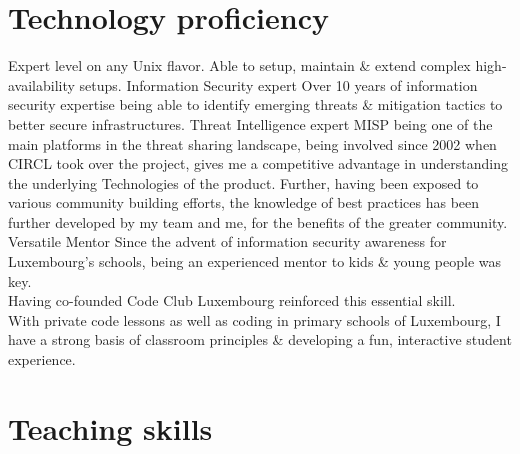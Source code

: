 \documentclass[a4paper]{friggeri-cv} %
\begin{document}

\section{Technology proficiency}

\begin{entrylist}
{}
{Expert level on any Unix flavor. Able to setup, maintain \& extend complex high-availability setups.}
{Information Security expert}
{}
{Over 10 years of information security expertise being able to identify emerging threats \& mitigation tactics to better secure infrastructures.}
{Threat Intelligence expert}
{}
{MISP being one of the main platforms in the threat sharing landscape, being involved since 2002 when CIRCL took over the project, gives me a competitive advantage in understanding the underlying Technologies of the product. Further, having been exposed to various community building efforts, the knowledge of best practices has been further developed by my team and me, for the benefits of the greater community.}
{Versatile Mentor}
{}
{Since the advent of information security awareness for Luxembourg's schools, being an experienced mentor to kids \& young people was key. \\
Having co-founded Code Club Luxembourg reinforced this essential skill. \\
With private code lessons as well as coding in primary schools of Luxembourg, I have a strong basis of classroom principles \& developing a fun, interactive student experience.}
\end{entrylist}


\section{Teaching skills}
\end{document}
